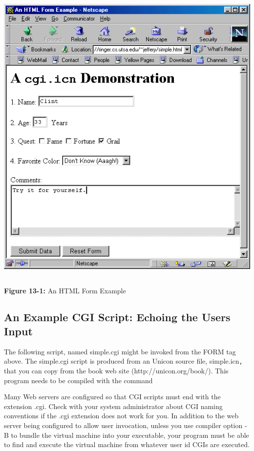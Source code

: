\begin{center}
\includegraphics[width=5.5516in,height=5.989in]{ub-img/ub-img44.png}
\end{center}

{\sffamily\bfseries Figure 13-1:}
{\sffamily An HTML Form Example}

\subsection{An Example CGI Script: Echoing the User{\textquotesingle}s
Input}

The following script, named \textsf{simple.cgi} might be invoked from
the \textsf{FORM} tag above. The \textsf{simple.cgi} script is produced
from an Unicon source file, \textsf{simple.icn}\texttt{,} that you can
copy from the book web site
(\textsf{http://unicon.org/book/}). This program needs to
be compiled with the command


Many Web servers are configured so that CGI scripts must end with the
extension \textsf{.cgi}. Check with your system administrator about CGI
naming conventions if the \textsf{.cgi} extension does not work for
you. In addition to the web server being configured to allow user
invocation, unless you use compiler option \textsf{{}-B} to bundle the
virtual machine into your executable, your program must be able to find
and execute the virtual machine from whatever user id
CGI{\textquotesingle}s are executed.

